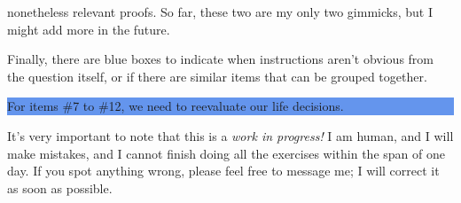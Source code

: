 \documentclass{article}
\begin{document}
nonetheless relevant proofs. So far, these two are my only two gimmicks, but I might add more in the future.\par
{}\par
Finally, there are blue boxes to indicate when instructions aren't obvious from the question itself, or if there are similar items that can be grouped together.\par
\parindent=25pt 
    \colorbox{CornflowerBlue}{
    \begin{minipage}[c]{0.9\textwidth}
        \centering
        For items \#7 to \#12, we need to reevaluate our life decisions.
    \end{minipage}
    }\parindent=0pt \par 
It's very important to note that this is a \textit{work in progress!} I am human, and I will make mistakes, and I cannot finish doing all the exercises within the span of one day. If you spot anything wrong, 
please feel free to message me; I will correct it as soon as possible.
\pagebreak 
\end{document}

